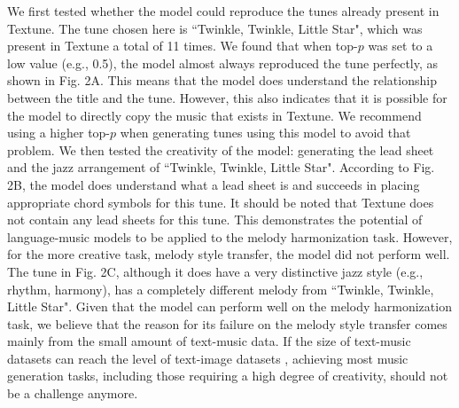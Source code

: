 \documentclass[letterpaper]{article} %
\begin{document}
\vspace{-4.14mm}
\vspace{-8.28mm}
We first tested whether the model could reproduce the tunes already present in Textune. The tune chosen here is ``Twinkle, Twinkle, Little Star", which was present in Textune a total of 11 times. We found that when top-$p$ was set to a low value (e.g., 0.5), the model almost always reproduced the tune perfectly, as shown in Fig. 2A. This means that the model does understand the relationship between the title and the tune. However, this also indicates that it is possible for the model to directly copy the music that exists in Textune. We recommend using a higher top-$p$ when generating tunes using this model to avoid that problem.  We then tested the creativity of the model: generating the lead sheet and the jazz arrangement of ``Twinkle, Twinkle, Little Star". According to Fig. 2B, the model does understand what a lead sheet is and succeeds in placing appropriate chord symbols for this tune. It should be noted that Textune does not contain any lead sheets for this tune. This demonstrates the potential of language-music models to be applied to the melody harmonization task. However, for the more creative task, melody style transfer, the model did not perform well. The tune in Fig. 2C, although it does have a very distinctive jazz style (e.g., rhythm, harmony), has a completely different melody from  ``Twinkle, Twinkle, Little Star". Given that the model can perform well on the melody harmonization task, we believe that the reason for its failure on the melody style transfer comes mainly from the small amount of text-music data. If the size of text-music datasets can reach the level of text-image datasets \cite{DBLP:journals/corr/abs-2111-02114}, achieving most music generation tasks, including those requiring a high degree of creativity, should not be a challenge anymore.
\end{document}
